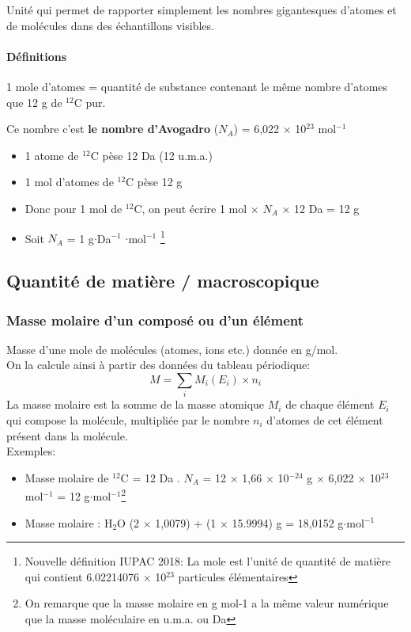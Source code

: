 \documentclass[10pt,a4paper]{book}
\begin{document}
Unité qui permet de rapporter simplement les nombres gigantesques d'atomes et de molécules dans des échantillons visibles.
\paragraph{Définitions} 1 mole d'atomes = quantité de substance contenant le même nombre d'atomes que 12 g de $^{12}$C pur. \par
Ce nombre c'est \textbf{le nombre d'Avogadro} ($N_A$) = 6,022 $\times$ 10$^{23}$ mol$^{-1}$
\begin{itemize}
\item 1 atome de $^{12}$C pèse 12 Da (12 u.m.a.)
\item 1 mol d'atomes de $^{12}$C pèse 12 g
\item Donc pour 1 mol de $^{12}$C, on peut écrire 1 mol $\times$ $N_A$ $\times$ 12 Da = 12 g
\item Soit $N_A$ = 1 g$\cdot$Da$^{-1}$ $\cdot$mol$^{-1}$ \footnote{Nouvelle définition IUPAC 2018: La mole est l'unité de quantité de matière qui contient 6.02214076 $\times$ 10$^{23}$ particules élémentaires} \\
\end{itemize}

\subsection{Quantité de matière / macroscopique}

\subsubsection{Masse molaire d'un composé ou d'un élément}

Masse d'une mole de molécules (atomes, ions etc.) donnée en g/mol. \\
On la calcule ainsi à partir des données du tableau périodique:
\begin{displaymath}
M = {\sum_i}M_i(E_i){\times}n_i
\end{displaymath}
La masse molaire est la somme de la masse atomique $M_i$ de chaque élément $E_i$ qui compose la molécule, multipliée par le nombre $n_i$ d'atomes de cet élément présent dans la molécule. \\
Exemples:
\begin{itemize}
\item Masse molaire de $^{12}$C = 12 Da . $N_A$ = 12 $\times$ 1,66 $\times$ 10$^{-24}$ g $\times$ 6,022 $\times$ 10$^{23}$ mol$^{-1}$ = 12 g$\cdot$mol$^{-1}$\footnote{On remarque que la masse molaire en g mol-1 a la même valeur numérique que la masse moléculaire en u.m.a. ou Da}
\item Masse molaire : H$_2$O (2 $\times$ 1,0079) + (1 $\times$ 15.9994) g = 18,0152 g$\cdot$mol$^{-1}$
\end{itemize}
\end{document}
